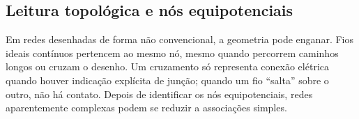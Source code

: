 \subsection{Leitura topológica e nós equipotenciais}

\begin{conceito}
Em redes desenhadas de forma não convencional, a geometria pode enganar. Fios
ideais contínuos pertencem ao mesmo nó, mesmo quando percorrem caminhos longos
ou cruzam o desenho. Um cruzamento só representa conexão elétrica quando houver
indicação explícita de junção; quando um fio ``salta'' sobre o outro, não há
contato. Depois de identificar os nós equipotenciais, redes aparentemente
complexas podem se reduzir a associações simples.
\end{conceito}

\blocoaprofundamento

